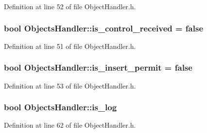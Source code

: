 Definition at line 52 of file Object\+Handler.\+h.

\subsubsection[{\texorpdfstring{is\+\_\+control\+\_\+received}{is_control_received}}]{\setlength{\rightskip}{0pt plus 5cm}bool Objects\+Handler\+::is\+\_\+control\+\_\+received = false}\hypertarget{class_objects_handler_a88fb913340c535df81f3b7ae5f06df61}{}\label{class_objects_handler_a88fb913340c535df81f3b7ae5f06df61}


Definition at line 51 of file Object\+Handler.\+h.

\subsubsection[{\texorpdfstring{is\+\_\+insert\+\_\+permit}{is_insert_permit}}]{\setlength{\rightskip}{0pt plus 5cm}bool Objects\+Handler\+::is\+\_\+insert\+\_\+permit = false}\hypertarget{class_objects_handler_acaefe98eb412d4c32cda2bf0bd602ae7}{}\label{class_objects_handler_acaefe98eb412d4c32cda2bf0bd602ae7}


Definition at line 53 of file Object\+Handler.\+h.

\subsubsection[{\texorpdfstring{is\+\_\+log}{is_log}}]{\setlength{\rightskip}{0pt plus 5cm}bool Objects\+Handler\+::is\+\_\+log}\hypertarget{class_objects_handler_a953cbc6386a438635bd1b12a8e479b38}{}\label{class_objects_handler_a953cbc6386a438635bd1b12a8e479b38}


Definition at line 62 of file Object\+Handler.\+h.


